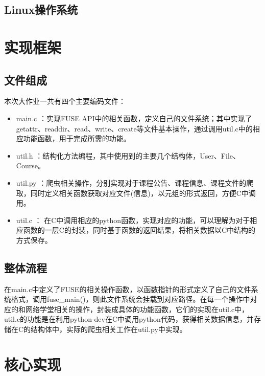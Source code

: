 


\subsection{Linux操作系统}




\section{实现框架}

\subsection{文件组成}
本次大作业一共有四个主要编码文件：
\begin{itemize}
	\item main.c ：实现FUSE API中的相关函数，定义自己的文件系统；其中实现了getattr、readdir、read、write、create等文件基本操作，通过调用util.c中的相应功能函数，用于完成所需的功能。
	\item util.h ：结构化方法编程，其中使用到的主要几个结构体，User、File、Course。
	\item util.py ：爬虫相关操作，分别实现对于课程公告、课程信息、课程文件的爬取，同时定义相关函数获取对应文件(信息)，以元组的形式返回，方便C中调用。
	\item util.c ： 在C中调用相应的python函数，实现对应的功能，可以理解为对于相应函数的一层C的封装，同时基于函数的返回结果，将相关数据以C中结构的方式保存。
\end{itemize}

\subsection{整体流程}
在main.c中定义了FUSE的相关操作函数，以函数指针的形式定义了自己的文件系统格式，调用fuse\_main()，则此文件系统会挂载到对应路径。在每一个操作中对应的和网络学堂相关的操作，封装成具体的功能函数，它们的实现在util.c中，util.c的功能是在利用python-dev在C中调用python代码，获得相关数据信息，并存储在C的结构体中，实际的爬虫相关工作在util.py中实现。

\section{核心实现}

